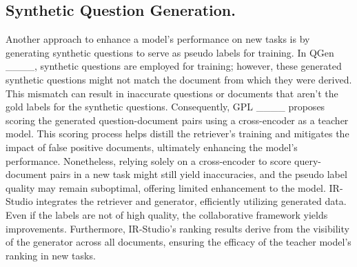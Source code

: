 \subsection{Synthetic Question Generation.}

Another approach to enhance a model's performance on new tasks is by generating synthetic questions to serve as pseudo labels for training. In QGen ____, synthetic questions are employed for training; however, these generated synthetic questions might not match the document from which they were derived. This mismatch can result in inaccurate questions or documents that aren't the gold labels for the synthetic questions. Consequently, GPL ____ proposes scoring the generated question-document pairs using a cross-encoder as a teacher model. This scoring process helps distill the retriever's training and mitigates the impact of false positive documents, ultimately enhancing the model's performance. Nonetheless, relying solely on a cross-encoder to score query-document pairs in a new task might still yield inaccuracies, and the pseudo label quality may remain suboptimal, offering limited enhancement to the model. IR-Studio integrates the retriever and generator, efficiently utilizing generated data. Even if the labels are not of high quality, the collaborative framework yields improvements. Furthermore, IR-Studio's ranking results derive from the visibility of the generator across all documents, ensuring the efficacy of the teacher model's ranking in new tasks.